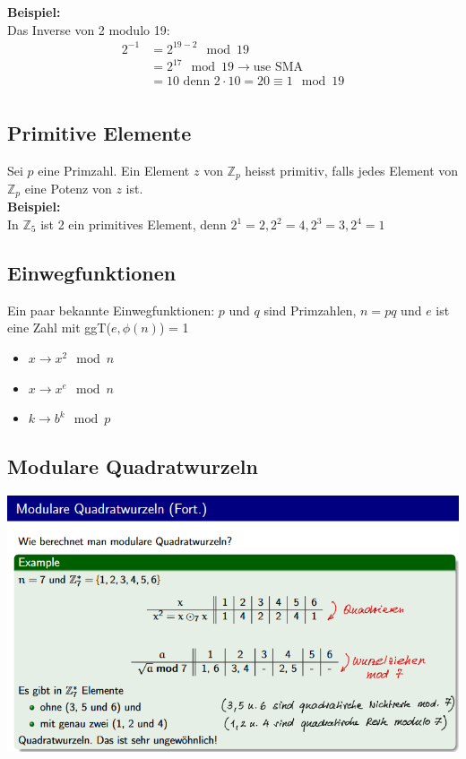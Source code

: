 \documentclass[12pt]{scrartcl}
\begin{document}
\textbf{Beispiel:}\\
Das Inverse von 2 modulo 19:\\
\begin{align*}
    2^{-1}  &= 2^{19-2} \mod 19\\
            &= 2^{17} \mod 19 \rightarrow \text{use SMA}\\
            &= 10 \text{ denn } 2 \cdot 10 = 20 \equiv 1 \mod 19\\
\end{align*}

\subsection{Primitive Elemente}
Sei $p$ eine Primzahl. Ein Element $z$ von $\mathbb{Z}_p$ heisst primitiv, falls jedes Element
von $\mathbb{Z}_p$ eine Potenz von $z$ ist.\\

\textbf{Beispiel:}\\
In $\mathbb{Z}_{5}$ ist 2 ein primitives Element, denn $2^1 = 2, 2^2 = 4, 2^3 = 3, 2^4 = 1$\\

\newpage
\subsection{Einwegfunktionen}
Ein paar bekannte Einwegfunktionen:
$p$ und $q$ sind Primzahlen, $n = pq$ und $e$ ist eine Zahl mit ggT($e, \phi(n)$) = 1

\begin{itemize}
    \item $x \rightarrow x^2 \mod n$
    \item $x \rightarrow x^e \mod n$
    \item $k \rightarrow b^k \mod p$
\end{itemize}


\subsection{Modulare Quadratwurzeln}
\includegraphics[width=14cm]{img/modulare_quadratwurzeln.png}
\end{document}
